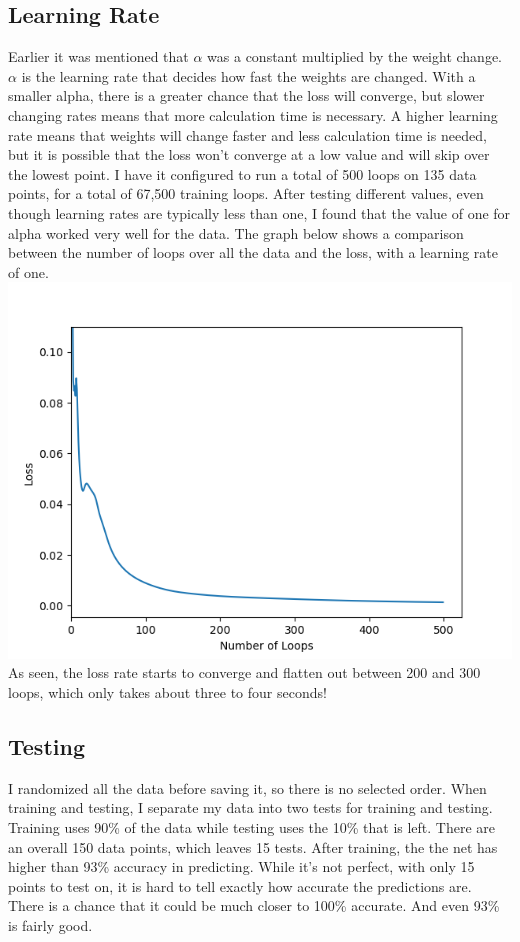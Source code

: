 \documentclass[12pt]{article}
\begin{document}
\subsection{Learning Rate}

Earlier it was mentioned that $\alpha$ was a constant multiplied by the weight change. $\alpha$ is the
learning rate that decides how fast the weights are changed. With a smaller alpha, there is a
greater chance that the loss will converge, but slower changing rates means that more calculation
time is necessary. A higher learning rate means that weights will change faster and less
calculation time is needed, but it is possible that the loss won't converge at a low value and will
skip over the lowest point. I have it configured to run a total of 500 loops on 135 data points, for a
total of 67,500 training loops. After testing different values, even though learning rates are typically
less than one, I found that the value of one for alpha worked very well for the data. The graph below shows a
comparison between the number of loops over all the data and the loss, with a learning rate of
one.
\includegraphics{img/trainvsloss.png}
As seen, the loss rate starts to converge and flatten out between 200 and 300 loops, which only
takes about three to four seconds!

\subsection{Testing}

I randomized all the data before saving it, so there is no selected order. When training and testing,
I separate my data into two tests for training and testing. Training uses 90\% of the data while
testing uses the 10\% that is left. There are an overall 150 data points, which leaves 15 tests. After
training, the the net has higher than 93\% accuracy in predicting. While it’s not perfect, with only 15
points to test on, it is hard to tell exactly how accurate the predictions are. There is a chance that it
could be much closer to 100\% accurate. And even 93\% is fairly good.
\end{document}
